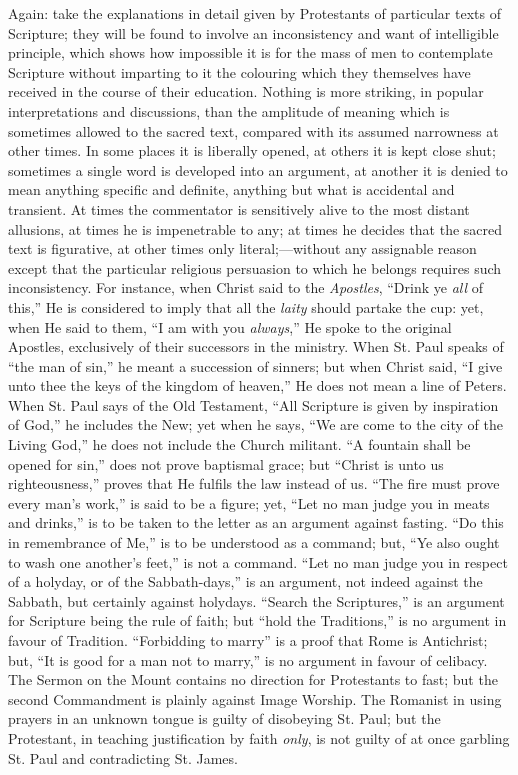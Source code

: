 Again: take the explanations in detail given by Protestants of
particular texts of Scripture; they will be found to involve an
inconsistency and want of intelligible principle, which shows how
impossible it is for the mass of men to contemplate Scripture without
imparting to it the colouring which they themselves have received in
the course of their education. Nothing is more striking, in
popular interpretations and discussions, than the amplitude of meaning
which is sometimes allowed to the sacred text, compared with its
assumed narrowness at other times. In some places it is liberally
opened, at others it is kept close shut; sometimes a single word is
developed into an argument, at another it is denied to mean anything
specific and definite, anything but what is accidental and transient.
At times the commentator is sensitively alive to the most distant
allusions, at times he is impenetrable to any; at times he decides
that the sacred text is figurative, at other times only literal;—without
any assignable reason except that the particular religious persuasion
to which he belongs requires such inconsistency. For instance, when
Christ said to the \emph{Apostles}, ``Drink ye \emph{all} of
this,'' He is considered to imply that all the \emph{laity} should
partake the cup: yet, when He said to them, ``I am with you \emph{always},''
He spoke to the original Apostles, exclusively of their successors in
the ministry. When St. Paul speaks of ``the man of sin,'' he
meant a succession of sinners; but when Christ said, ``I give unto
thee the keys of the kingdom of heaven,'' He does not mean a line
of Peters. When St. Paul says of the Old Testament, ``All
Scripture is given by inspiration of God,'' he includes the New;
yet when he says, ``We are come to the city of the Living
God,'' he does not include the Church militant. ``A fountain
shall be opened for sin,'' does not prove baptismal grace; but
``Christ is unto us righteousness,'' proves that He fulfils
the law instead of us. ``The fire must prove every man's
work,'' is said to be a figure; yet, ``Let no man judge you in
meats and drinks,'' is to be taken to the letter as an argument
against fasting. ``Do this in remembrance of Me,'' is to be
understood as a command; but, ``Ye also ought to wash one another's
feet,'' is not a command. ``Let no man judge you in respect of
a holyday, or of the Sabbath-days,'' is an argument, not
indeed against the Sabbath, but certainly against holydays.
``Search the Scriptures,'' is an argument for Scripture being
the rule of faith; but ``hold the Traditions,'' is no argument
in favour of Tradition. ``Forbidding to marry'' is a proof
that Rome is Antichrist; but, ``It is good for a man not to
marry,'' is no argument in favour of celibacy. The Sermon on the
Mount contains no direction for Protestants to fast; but the second
Commandment is plainly against Image Worship. The Romanist in using
prayers in an unknown tongue is guilty of disobeying St. Paul; but the
Protestant, in teaching justification by faith \emph{only}, is not guilty of
at once garbling St. Paul and contradicting St. James.

